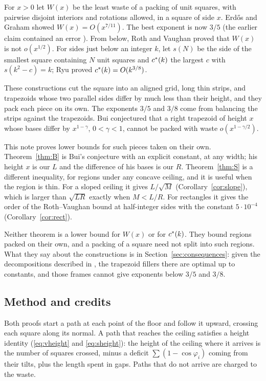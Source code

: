 For $x>0$ let $W(x)$ be the least waste of a packing of unit squares, with pairwise disjoint interiors and rotations allowed, in a square of side $x$. Erd\H{o}s and Graham \cite{EG75} showed $W(x)=O(x^{7/11})$. The best exponent is now $3/5$ \cite{Bui25,McC26} (the earlier claim \cite{CG20} contained an error \cite{AB26}). From below, Roth and Vaughan \cite{RV78} proved that $W(x)$ is not $o(x^{1/2})$. For sides just below an integer $k$, let $s(N)$ be the side of the smallest square containing $N$ unit squares and $c^{*}(k)$ the largest $c$ with $s(k^2-c)=k$; Ryu \cite{Ryu26} proved $c^{*}(k)=O(k^{3/8})$.

These constructions cut the square into an aligned grid, long thin strips, and trapezoids whose two parallel sides differ by much less than their height, and they pack each piece on its own. The exponents $3/5$ and $3/8$ come from balancing the strips against the trapezoids. Bui conjectured \cite[Conjecture~1]{Bui25} that a right trapezoid of height $x$ whose bases differ by $x^{1-\gamma}$, $0<\gamma<1$, cannot be packed with waste $o(x^{1-\gamma/2})$.

This note proves lower bounds for such pieces taken on their own. Theorem~\ref{thm:B} is Bui's conjecture with an explicit constant, at any width; his height $x$ is our $L$ and the difference of his bases is our $R$. Theorem~\ref{thm:S} is a different inequality, for regions under any concave ceiling, and it is useful when the region is thin. For a sloped ceiling it gives $L/\sqrt M$ (Corollary~\ref{cor:slope}), which is larger than $\sqrt{LR}$ exactly when $M<L/R$. For rectangles it gives the order of the Roth--Vaughan bound at half-integer sides with the constant $5\cdot10^{-4}$ (Corollary~\ref{cor:rect}).

Neither theorem is a lower bound for $W(x)$ or for $c^{*}(k)$. They bound regions packed on their own, and a packing of a square need not split into such regions. What they say about the constructions is in Section~\ref{sec:consequences}: given the decompositions described in \cite{Bui25,McC26,Ryu26}, the trapezoid fillers there are optimal up to constants, and those frames cannot give exponents below $3/5$ and $3/8$.

\subsection*{Method and credits}
Both proofs start a path at each point of the floor and follow it upward, crossing each square along its normal. A path that reaches the ceiling satisfies a height identity (\eqref{eq:vheight} and \eqref{eq:sheight}): the height of the ceiling where it arrives is the number of squares crossed, minus a deficit $\sum(1-\cos\varphi_i)$ coming from their tilts, plus the length spent in gaps. Paths that do not arrive are charged to the waste.

